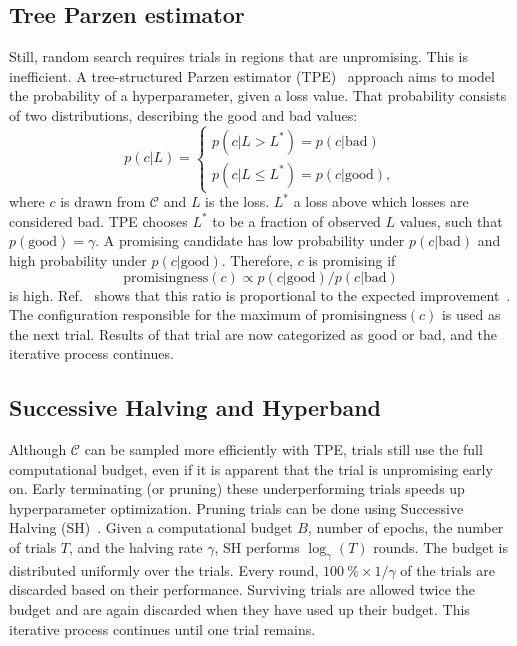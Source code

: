 \subsection{Tree Parzen estimator}
Still, random search requires trials in regions that are unpromising.
This is inefficient.
A tree-structured Parzen estimator (TPE)~\cite{Bergstra2011} approach aims to model the probability of a hyperparameter, given a loss value.
That probability consists of two distributions, describing the good and bad values:
\begin{equation}
    p(c|L) =
    \begin{cases}
        p(c|L > L^*) = p(c|\mathrm{bad}) \\
        p(c|L \leq L^*) = p(c|\mathrm{good}),
    \end{cases}
\end{equation}
where $c$ is drawn from $\mathcal{C}$ and $L$ is the loss.
$L^*$ a loss above which losses are considered bad.
TPE chooses $L^*$ to be a fraction of observed $L$ values, such that $p(\mathrm{good}) = \gamma$.
A promising candidate has low probability under $p(c|\mathrm{bad})$ and high probability under $p(c|\mathrm{good})$.
Therefore, $c$ is promising if
\begin{equation}
    \mathrm{promisingness}(c) \propto p(c|\mathrm{good}) / p(c|\mathrm{bad})
\end{equation}
is high.
Ref.~\cite{Bergstra2011} shows that this ratio is proportional to the expected improvement~\cite{Jones2001}.
The configuration responsible for the maximum of $\mathrm{promisingness}(c)$ is used as the next trial.
Results of that trial are now categorized as good or bad, and the iterative process continues.

\subsection{Successive Halving and Hyperband}
Although $\mathcal{C}$ can be sampled more efficiently with TPE, trials still use the full computational budget, even if it is apparent that the trial is unpromising early on.
Early terminating (or pruning) these underperforming trials speeds up hyperparameter optimization.
Pruning trials can be done using Successive Halving (SH)~\cite{Jamieson2016}.
Given a computational budget $B$, \eg number of epochs, the number of trials $T$, and the halving rate $\gamma$, SH performs $\log_\gamma(T)$ rounds.
The budget is distributed uniformly over the trials.
Every round, $\SI{100}{\percent} \times 1/\gamma$ of the trials are discarded based on their performance.
Surviving trials are allowed twice the budget and are again discarded when they have used up their budget.
This iterative process continues until one trial remains.

